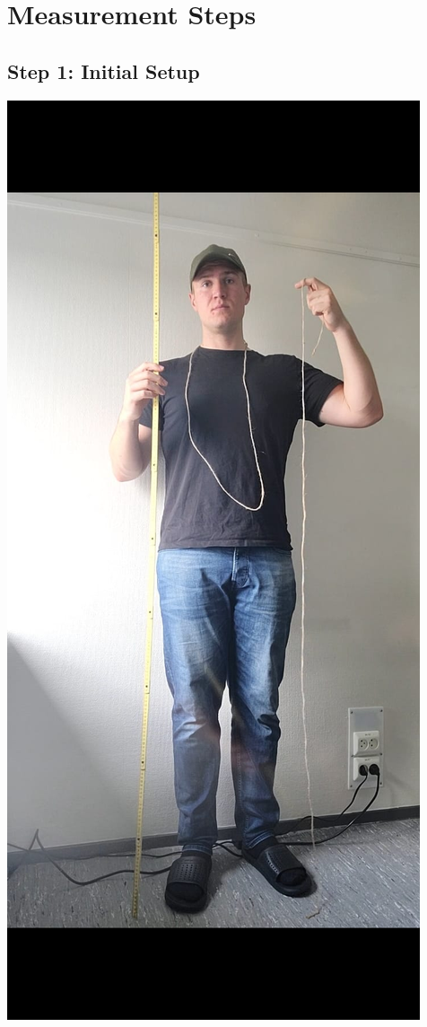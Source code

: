 \documentclass[11pt,a4paper]{article}
\begin{document}
\newpage

\section{Measurement Steps}

\subsection{Step 1: Initial Setup}
\begin{multicols}{2}
    \includegraphics[width=\linewidth]{setup.jpg}
    

\end{multicols}
\end{document}
